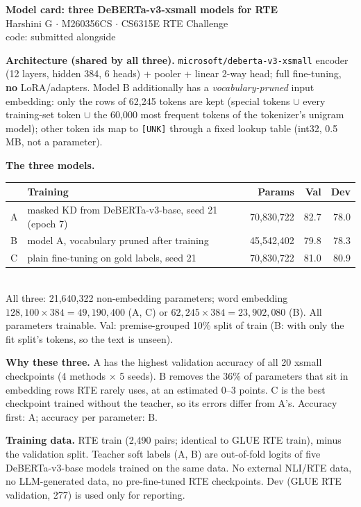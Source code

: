\documentclass[11pt]{article}
\begin{document}
\sloppy
{\Large\bfseries Model card: three DeBERTa-v3-xsmall models for RTE}\\[2pt]
{\small Harshini G $\cdot$ M260356CS $\cdot$ CS6315E RTE Challenge \\ code: submitted alongside}

\textbf{Architecture (shared by all three).} \texttt{microsoft/deberta-v3-xsmall} encoder (12 layers, hidden 384, 6 heads) + pooler + linear 2-way head; full fine-tuning, \textbf{no} LoRA/adapters. Model B additionally has a \emph{vocabulary-pruned} input embedding: only the rows of 62,245 tokens are kept (special tokens $\cup$ every training-set token $\cup$ the 60,000 most frequent tokens of the tokenizer's unigram model); other token ids map to \texttt{[UNK]} through a fixed lookup table (int32, 0.5 MB, not a parameter).

\textbf{The three models.}\\[2pt]
\begin{tabularx}{\linewidth}{@{}lXrrr@{}}
\toprule
 & Training & Params & Val & Dev \\
\midrule
A & masked KD from DeBERTa-v3-base, seed 21 (epoch 7) & 70,830,722 & 82.7 & 78.0 \\
B & model A, vocabulary pruned after training & 45,542,402 & 79.8 & 78.3 \\
C & plain fine-tuning on gold labels, seed 21 & 70,830,722 & 81.0 & 80.9 \\
\bottomrule
\end{tabularx}\\[2pt]
{\small All three: 21,640,322 non-embedding parameters; word embedding $128{,}100\times384 = 49{,}190{,}400$ (A, C) or $62{,}245\times384 = 23{,}902{,}080$ (B). All parameters trainable. Val: premise-grouped 10\% split of train (B: with only the fit split's tokens, so the text is unseen).}

\textbf{Why these three.} A has the highest validation accuracy of all 20 xsmall checkpoints (4 methods $\times$ 5 seeds). B removes the 36\% of parameters that sit in embedding rows RTE rarely uses, at an estimated 0--3 points. C is the best checkpoint trained without the teacher, so its errors differ from A's. Accuracy first: A; accuracy per parameter: B.

\textbf{Training data.} RTE train (2,490 pairs; identical to GLUE RTE train), minus the validation split. Teacher soft labels (A, B) are out-of-fold logits of five DeBERTa-v3-base models trained on the same data. No external NLI/RTE data, no LLM-generated data, no pre-fine-tuned RTE checkpoints. Dev (GLUE RTE validation, 277) is used only for reporting.
\end{document}

